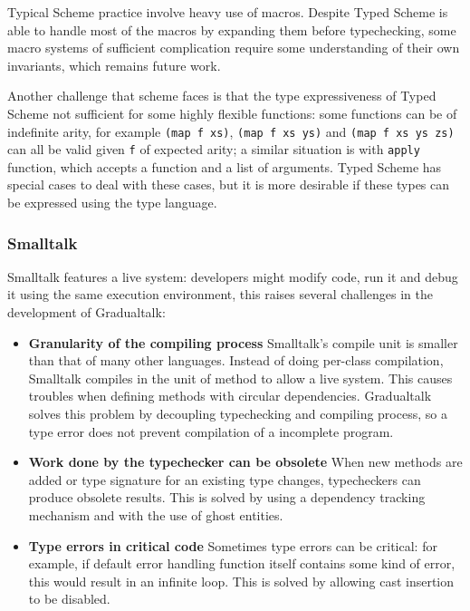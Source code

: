 Typical Scheme practice involve heavy use of macros.
Despite Typed Scheme is able to handle most of the macros by expanding them before typechecking,
some macro systems of sufficient complication require some understanding of their own invariants,
which remains future work.

Another challenge that scheme faces is that the type expressiveness of Typed Scheme
not sufficient for some highly flexible functions:
some functions can be of indefinite arity, for example \texttt{(map f xs)}, \texttt{(map f xs ys)}
and \texttt{(map f xs ys zs)} can all be valid given \texttt{f} of expected arity;
a similar situation is with \texttt{apply} function, which accepts a function and a list of arguments.
Typed Scheme has special cases to deal with these cases, but it is more desirable
if these types can be expressed using the type language.

\subsubsection{Smalltalk}

Smalltalk features a live system: developers might modify code, run it and debug it using the same execution environment, this raises several challenges in the development of Gradualtalk:

\begin{itemize}
	\item \textbf{Granularity of the compiling process}
	Smalltalk's compile unit is smaller than that of many other languages.
	Instead of doing per-class compilation, Smalltalk compiles in the unit of method to
	allow a live system. This causes troubles when defining methods with circular dependencies.
	Gradualtalk solves this problem by decoupling typechecking and compiling process,
	so a type error does not prevent compilation of a incomplete program.
	\item \textbf{Work done by the typechecker can be obsolete}
	When new methods are added or type signature for an existing type changes,
	typecheckers can produce obsolete results. This is solved by using a dependency tracking
	mechanism and with the use of ghost entities.
	\item \textbf{Type errors in critical code} Sometimes type errors can be critical:
	for example, if default error handling function itself contains some kind of error,
	this would result in an infinite loop. This is solved by allowing cast insertion
	to be disabled.
\end{itemize}
